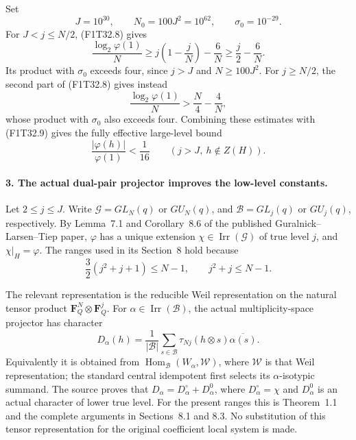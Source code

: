 Set
\[
             J=10^{30},\qquad N_0=100J^2=10^{62},
             \qquad \sigma_0=10^{-29}.
 \tag{F1T32.10}
\]
For \(J<j\le N/2\), (F1T32.8) gives
\[
 \frac{\log_2\varphi(1)}N
 \ge j\left(1-\frac jN\right)-\frac6N
 \ge\frac j2-\frac6N.
 \tag{F1T32.11}
\]
Its product with \(\sigma_0\) exceeds four, since
\(j>J\) and \(N\ge100J^2\).
For \(j\ge N/2\), the second part of (F1T32.8)
gives instead
\[
 \frac{\log_2\varphi(1)}N>\frac N4-\frac4N,
 \tag{F1T32.12}
\]
whose product with \(\sigma_0\) also exceeds four.
Combining these estimates with (F1T32.9) gives the
fully effective large-level bound
\[
       \frac{|\varphi(h)|}{\varphi(1)}<\frac1{16}
       \qquad(j>J,\ h\notin Z(H)).
 \tag{F1T32.13}
\]

\paragraph{3. The actual dual-pair projector improves the low-level constants.}
Let \(2\le j\le J\). Write
\(\mathcal G=GL_N(q)\) or \(GU_N(q)\), and
\(\mathcal B=GL_j(q)\) or \(GU_j(q)\), respectively.
By Lemma~7.1 and Corollary~8.6 of the published
Guralnick--Larsen--Tiep paper, \(\varphi\) has a
unique extension \(\chi\in\operatorname{Irr}(\mathcal G)\)
of true level \(j\), and \(\chi|_H=\varphi\).
The ranges used in its Section~8 hold because
\[
 \frac32(j^2+j+1)\le N-1,
 \qquad j^2+j\le N-1.
 \tag{F1T32.14}
\]

The relevant representation is the reducible Weil
representation on the natural tensor product
\(\mathbf F_Q^N\otimes\mathbf F_Q^j\).
For \(\alpha\in\operatorname{Irr}(\mathcal B)\),
the actual multiplicity-space projector has character
\[
 D_\alpha(h)=\frac1{|\mathcal B|}
       \sum_{s\in\mathcal B}
           \tau_{Nj}(h\otimes s)\overline{\alpha(s)}.
 \tag{F1T32.15}
\]
Equivalently it is obtained from
\(\operatorname{Hom}_{\mathcal B}
 (W_\alpha,\mathcal W)\), where \(\mathcal W\)
is that Weil representation; the standard central
idempotent first selects its \(\alpha\)-isotypic
summand. The source proves that
\(D_\alpha=D_\alpha^\circ+D_\alpha^0\), where
\(D_\alpha^\circ=\chi\) and \(D_\alpha^0\)
is an actual character of lower true level.
For the present ranges this is Theorem~1.1 and the
complete arguments in Sections~8.1 and 8.3.
No substitution of this tensor representation for the
original coefficient local system is made.

